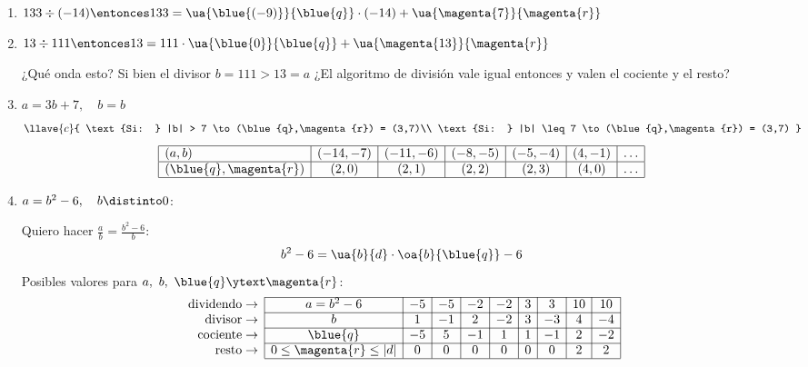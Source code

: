 \begin{enumerate}[label=\alph*)]
  \item $133 \div (-14) \entonces 133 = \ua{\blue{(-9)}}{\blue{q}} \cdot (-14) + \ua{\magenta{7}}{\magenta{r}}$

  \item $13 \div 111  \entonces 13 = 111 \cdot \ua{\blue{0}}{\blue{q}} + \ua{\magenta{13}}{\magenta{r}}$

        ¿Qué onda esto? Si bien el divisor $b = 111 > 13 = a$ ¿El algoritmo de división vale igual entonces y
        valen el cociente y el resto?

  \item $a = 3b + 7,\quad b = b$
        $$
          \llave{c}{
            \text{Si: } |b| > 7 \to (\blue{q},\magenta{r}) = (3,7)\\
            \text{Si: } |b| \leq 7 \to (\blue{q},\magenta{r}) = (3,7)
          }
        $$
        $$
          \begin{array}{|l|c|c|c|c|c|c|c|}
            \hline
            (a,b)                  & (-14,-7) & (-11,-6) & (-8,-5) & (-5,-4) & (4, -1) & \dots \\ \hline
            (\blue{q},\magenta{r}) & (2,0)    & (2,1)    & (2,2)   & (2,3)   & (4, 0)  & \dots \\ \hline
          \end{array}
        $$

  \item $a = b^2 - 6,\quad b \distinto 0$:

        Quiero hacer $\frac{a}{b} = \frac{b^2 - 6}{b}$:
        $$
          b^2 - 6 = \ua{b}{d} \cdot \oa{b}{\blue{q}} - 6
        $$
        Posibles valores para $a,\ b,\ \blue{q} \ytext \magenta{r}$:
        $$
          \begin{array}{r|c|c|c|c|c|c|c|c|c|c|} \cline{2-10}
            \text{dividendo}\to & a = b^2 - 6                 & -5 & -5 & -2 & -2 & 3 & 3  & 10 & 10 \\ \cline{2-10}
            \text{divisor}  \to & b                           & 1  & -1 & 2  & -2 & 3 & -3 & 4  & -4 \\ \cline{2-10}
            \text{cociente} \to & \blue{q}                    & -5 & 5  & -1 & 1  & 1 & -1 & 2  & -2 \\ \cline{2-10}
            \text{resto}    \to & 0 \leq \magenta{r} \leq |d| & 0  & 0  & 0  & 0  & 0 & 0  & 2  & 2  \\ \cline{2-10}
          \end{array}
        $$


\end{enumerate}

